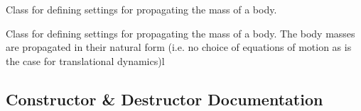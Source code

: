 Class for defining settings for propagating the mass of a body. 

Class for defining settings for propagating the mass of a body. The body masses are propagated in their natural form (i.\+e. no choice of equations of motion as is the case for translational dynamics)l 

\subsection{Constructor \& Destructor Documentation}
